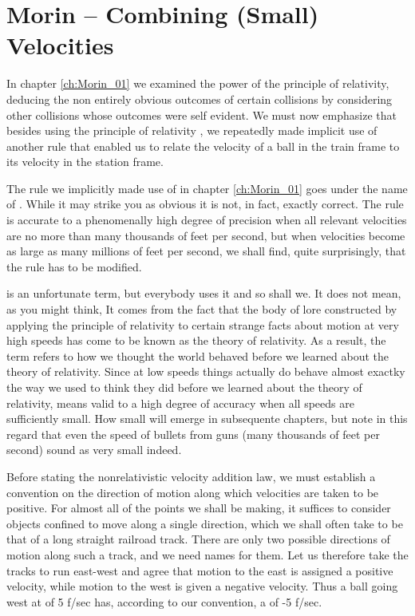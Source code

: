 \chapter{Morin -- Combining (Small) Velocities}
\label{ch:Morin_02}
In chapter \ref{ch:Morin_01} we examined the power of the principle of relativity, deducing the non entirely obvious outcomes of certain collisions by considering other collisions whose outcomes were self evident. We must now emphasize that besides using the principle of relativity , we repeatedly made implicit use of another rule that enabled us to relate the velocity of a ball in the train frame to its velocity in the station frame. 

The rule we implicitly made use of in chapter \ref{ch:Morin_01} goes under the name of . While it may strike you as obvious it is not, in fact, exactly correct.  The rule is accurate to a phenomenally high degree of precision when all relevant velocities are no more than many thousands of feet per second, but when velocities become as large as many millions of feet per second, we shall find, quite surprisingly, that the rule has to be modified.

 is an unfortunate term, but everybody uses it and so shall we. It does not mean, as you might think,  It comes from the fact that the body of lore constructed by applying the principle of relativity to certain strange facts about motion at very high speeds has come to be known as the theory of relativity. As a result, the term  refers to how we thought the world behaved before we learned about the theory of relativity. Since at low speeds things actually do behave almost exactky the way we used to think they did before we learned about the theory of relativity,  means valid to a high degree of accuracy when all speeds are sufficiently small. How small will emerge in subsequente chapters, but note in this regard that even the speed of bullets from guns (many thousands of feet per second) sound as very small indeed. 

Before stating the nonrelativistic velocity addition law, we must establish a convention on the direction of motion along which velocities are taken to be positive. For almost all of the points we shall be making, it suffices to consider objects confined to move along a single direction, which we shall often take to be that of a long straight railroad track. There are only two possible directions of motion along such a track, and we need names for them. Let us therefore take the tracks to run east-west and agree that motion to the east is assigned a positive velocity, while motion to the west is given a negative velocity. Thus a ball going west at  of 5 f/sec has, according to our convention, a  of -5 f/sec.

